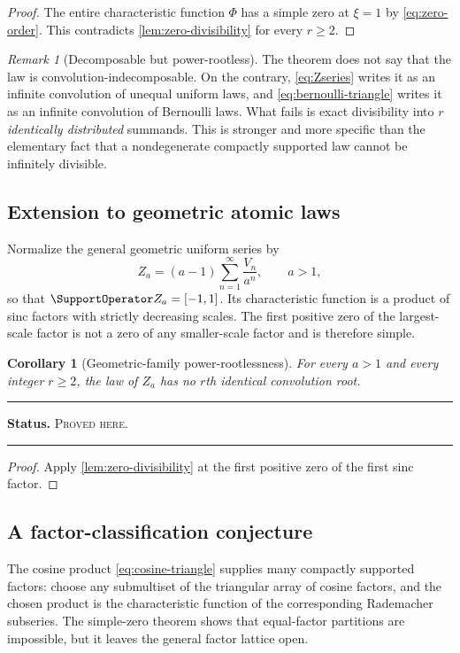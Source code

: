 \documentclass[11pt,oneside]{article}
\newtheorem{corollary}[theorem]{Corollary}
\theoremstyle{definition}
\theoremstyle{remark}
\newtheorem{remark}[theorem]{Remark}
\newenvironment{boxedremark}{%
  \par\smallskip\noindent\begin{center}\begin{minipage}{0.94\textwidth}%
  \color{black}\hrule\vspace{0.6em}\small
}{%
  \vspace{0.6em}\hrule\end{minipage}\end{center}\smallskip
}
\newcommand{\ProvedHere}{\textsc{Proved here}}
\newcommand{\Status}[1]{%
  \begin{boxedremark}\textbf{Status.} #1.\end{boxedremark}}
\begin{document}
\begin{proof}
The entire characteristic function $\Phi$ has a simple zero at $\xi=1$ by
\eqref{eq:zero-order}.  This contradicts \cref{lem:zero-divisibility} for every
$r\ge2$.
\end{proof}

\begin{remark}[Decomposable but power-rootless]
The theorem does not say that the law is convolution-indecomposable.  On the
contrary, \eqref{eq:Zseries} writes it as an infinite convolution of unequal
uniform laws, and \eqref{eq:bernoulli-triangle} writes it as an infinite convolution
of Bernoulli laws.  What fails is exact divisibility into $r$ \emph{identically
distributed} summands.  This is stronger and more specific than the elementary
fact that a nondegenerate compactly supported law cannot be infinitely divisible.
\end{remark}

\subsection{Extension to geometric atomic laws}
Normalize the general geometric uniform series by
\begin{equation}\label{eq:Za}
 Z_a=(a-1)\sum_{n=1}^{\infty}\frac{V_n}{a^n},\qquad a>1,
\end{equation}
so that $\SupportOperator Z_a=[-1,1]$.  Its characteristic function is a product of sinc
factors with strictly decreasing scales.  The first positive zero of the
largest-scale factor is not a zero of any smaller-scale factor and is therefore
simple.

\begin{corollary}[Geometric-family power-rootlessness]\label{cor:rootless-a}
For every $a>1$ and every integer $r\ge2$, the law of $Z_a$ has no $r$th
identical convolution root.
\end{corollary}
\Status{\ProvedHere}

\begin{proof}
Apply \cref{lem:zero-divisibility} at the first positive zero of the first sinc
factor.
\end{proof}

\subsection{A factor-classification conjecture}
The cosine product \eqref{eq:cosine-triangle} supplies many compactly supported
factors: choose any submultiset of the triangular array of cosine factors, and the
chosen product is the characteristic function of the corresponding Rademacher
subseries.  The simple-zero theorem shows that equal-factor partitions are
impossible, but it leaves the general factor lattice open.
\end{document}
